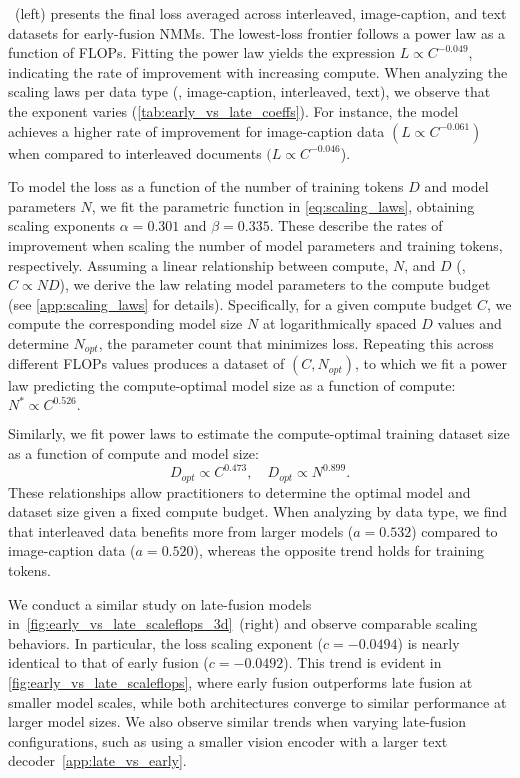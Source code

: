 ~(left) presents the final loss averaged
across interleaved, image-caption, and text datasets for early-fusion NMMs. The
lowest-loss frontier follows a power law as a function of FLOPs. Fitting the
power law yields the expression $L \propto C^{-0.049}$, indicating the rate of
improvement with increasing compute. When analyzing the scaling laws per data
type (\eg, image-caption, interleaved, text), we observe that the exponent
varies (\cref{tab:early_vs_late_coeffs}). For instance, the model achieves a
higher rate of improvement for image-caption data $(L \propto C^{-0.061})$ when
compared to interleaved documents $(L \propto C^{-0.046}$).  

To model the loss as a function of the number of training tokens $D$ and model
parameters $N$, we fit the parametric function in \cref{eq:scaling_laws}, obtaining
scaling exponents $\alpha = 0.301$ and $\beta = 0.335$. These describe the rates
of improvement when scaling the number of model parameters and training tokens, respectively.
Assuming a linear relationship between compute, $N$, and $D$ (\ie, $C \propto ND$),
we derive the law relating model parameters to the compute budget (see
\cref{app:scaling_laws} for details). Specifically, for a given compute budget
$C$, we compute the corresponding model size $N$ at logarithmically spaced $D$
values and determine $N_{opt}$, the parameter count that minimizes loss.
Repeating this across different FLOPs values produces a dataset of $(C,
N_{opt})$, to which we fit a power law predicting the compute-optimal model size
as a function of compute: $N^* \propto C^{0.526}.$

Similarly, we fit power laws to estimate the compute-optimal training dataset
size as a function of compute and model size:  
\[
D_{opt} \propto C^{0.473}, \quad D_{opt} \propto N^{0.899}.
\]  
These relationships allow practitioners to determine the optimal model and
dataset size given a fixed compute budget. When analyzing by data type, we find
that interleaved data benefits more from larger models ($a=0.532$) compared to
image-caption data ($a=0.520$), whereas the opposite trend holds for training
tokens.  







We conduct a similar study on late-fusion models
in~\cref{fig:early_vs_late_scaleflops_3d}~(right) and observe comparable scaling
behaviors. In particular, the loss scaling exponent ($c = -0.0494$) is nearly
identical to that of early fusion ($c = -0.0492$).  
This trend is evident in \cref{fig:early_vs_late_scaleflops}, where early fusion
outperforms late fusion at smaller model scales, while both architectures
converge to similar performance at larger model sizes. We also observe similar
trends when varying late-fusion configurations, such as using a smaller vision
encoder with a larger text decoder~\cref{app:late_vs_early}.


